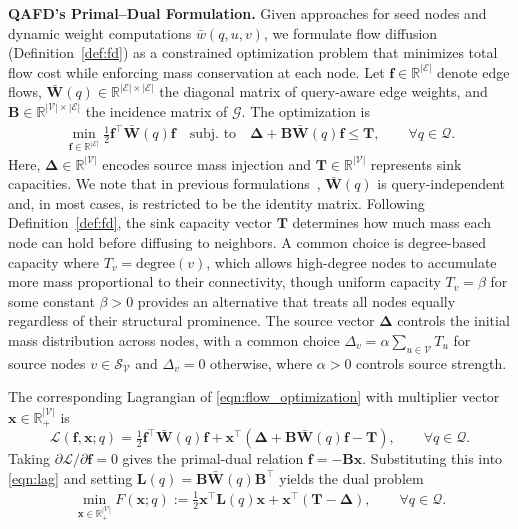 \documentclass{article} %
\begin{document}
\noindent \textbf{QAFD’s Primal–Dual Formulation.}  Given approaches for seed nodes and dynamic weight computations $\bar{w}(q, u, v)$, 
we formulate flow diffusion (Definition~\ref{def:fd}) as a constrained optimization problem that minimizes total flow cost while enforcing mass conservation at each node. 
Let $\mathbf{f} \in \mathbb{R}^{|\mathcal{E}|}$ denote edge flows, 
$\bar{\mathbf{W}}(q) \in \mathbb{R}^{|\mathcal{E}| \times |\mathcal{E}|}$ the diagonal matrix of query-aware edge weights, 
and $\mathbf{B} \in \mathbb{R}^{|\mathcal{V}| \times |\mathcal{E}|}$ the incidence matrix of $\mathcal{G}$. The optimization is
\begin{align}
\label{eqn:flow_optimization}
\min_{\mathbf{f} \in \mathbb{R}^{|\mathcal{E}|}} \frac{1}{2} \mathbf{f}^\top \bar{\mathbf{W}}(q) \mathbf{f} \quad \text{subj. to} \quad \boldsymbol{\Delta} + \mathbf{B} \bar{\mathbf{W}}(q) \mathbf{f} \leq \mathbf{T}, \qquad \forall q \in \mathcal{Q}. %
\end{align}
Here, $\boldsymbol{\Delta} \in \mathbb{R}^{|\mathcal{V}|}$ encodes source mass injection and $\mathbf{T} \in \mathbb{R}^{|\mathcal{V}|}$ represents sink capacities. We note that in previous formulations~\citep{WFHM2017,fountoulakis2020p,fountoulakis2023flow}, $\bar{\mathbf{W}}(q)$ is query-independent and, in most cases, is restricted to be the identity matrix. Following Definition~\ref{def:fd}, the sink capacity vector $\mathbf{T}$ determines how much mass each node can hold before diffusing to neighbors. A common choice is degree-based capacity where $T_v = \text{degree}(v)$, which allows high-degree nodes to accumulate more mass proportional to their connectivity, though uniform capacity $T_v = \beta$ for some constant $\beta > 0$ provides an alternative that treats all nodes equally regardless of their structural prominence. The source vector $\boldsymbol{\Delta}$ controls the initial mass distribution across nodes, with a common choice $\Delta_v = \alpha \sum_{u \in \mathcal{V}} T_u $ for source nodes $v \in \mathcal{S}_{\mathcal{V}}$ and $\Delta_v = 0$ otherwise, where $\alpha > 0$ controls source strength.  

The corresponding Lagrangian of \eqref{eqn:flow_optimization} with multiplier vector $\mathbf{x} \in \mathbb{R}^{|\mathcal{V}|}_{+}$ is
\begin{equation}\label{eqn:lag}
\mathcal{L}(\mathbf{f}, \mathbf{x}; q ) = \tfrac{1}{2} \mathbf{f}^\top \bar{\mathbf{W}}(q) \mathbf{f} 
+ \mathbf{x}^\top \left(\boldsymbol{\Delta} + \mathbf{B} \bar{\mathbf{W}}(q) \mathbf{f} - \mathbf{T}\right),
\qquad \forall q \in \mathcal{Q}.
\end{equation}
Taking $\partial \mathcal{L}/\partial \mathbf{f} = 0$ gives the primal-dual relation $\mathbf{f} = -\mathbf{B} \mathbf{x}$. Substituting this into \eqref{eqn:lag} and setting $\mathbf{L}(q) = \mathbf{B}\bar{\mathbf{W}}(q) \mathbf{B}^\top$ yields the dual problem
\begin{align}\label{eqn:dual:prob}
\min_{\mathbf{x} \in \mathbb{R}^{|\mathcal{V}|}_{+}} F(\mathbf{x};q) 
:= \tfrac{1}{2} \mathbf{x}^\top \mathbf{L}(q) \mathbf{x} 
+ \mathbf{x}^\top (\mathbf{T} - \boldsymbol{\Delta}),
\qquad \forall q \in \mathcal{Q}.
\end{align}
\end{document}
